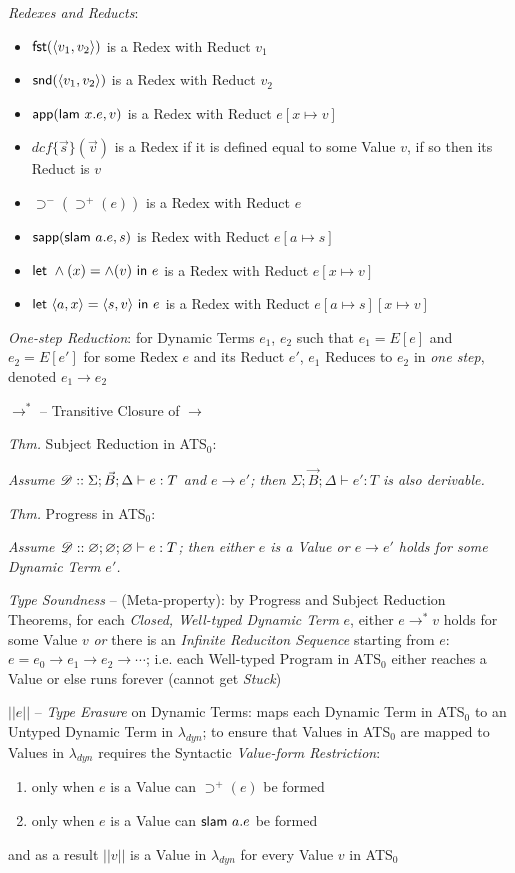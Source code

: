 \emph{Redexes and Reducts}:
\begin{itemize}
\item $\mathsf{fst}(\langle{v_1,v_2}\rangle)$ is a Redex with Reduct $v_1$
\item $\mathsf{snd}(\langle{v_1,v_2}\rangle)$ is a Redex with Reduct $v_2$
\item $\mathsf{app}(\mathsf{lam}\ x.e,v)$ is a Redex with Reduct $e[x \mapsto v]$
\item $dcf\{\vec{s}\}(\vec{v})$ is a Redex if it is defined equal to
  some Value $v$, if so then its Reduct is $v$
\item $\supset^-(\supset^+(e))$ is a Redex with Reduct $e$
\item $\mathsf{sapp}(\mathsf{slam}\ a.e,s)$ is Redex with Reduct $e[a \mapsto s]$
\item $\lett\ \wedge(x) = \wedge(v) \ \inn\ e$ is a Redex with Reduct
  $e[x \mapsto v]$
\item $\mathsf{let}\ \langle{a,x}\rangle = \langle{s,v}\rangle \ \mathsf{in}\ e$ is
  a Redex with Reduct $e[a \mapsto s][x \mapsto v]$
\end{itemize}

\emph{One-step Reduction}: for Dynamic Terms $e_1$, $e_2$ such that
$e_1 = E[e]$ and $e_2 = E[e']$ for some Redex $e$ and its Reduct $e'$,
$e_1$ Reduces to $e_2$ in \emph{one step}, denoted $e_1 \rightarrow
e_2$

$\rightarrow^*$ -- Transitive Closure of $\rightarrow$

\emph{Thm.} Subject Reduction in ATS$_0$:

\emph{Assume $\mathscr{D} :: \Sigma;\vec{B};\Delta \vdash e:T$ and $e
  \rightarrow e'$; then $\Sigma;\vec{B};\Delta \vdash e':T$ is also
  derivable.}


\emph{Thm.} Progress in ATS$_0$:

\emph{Assume $\mathscr{D} :: \varnothing;\varnothing;\varnothing \vdash
  e:T$; then either $e$ is a Value or $e \rightarrow e'$ holds for
  some Dynamic Term $e'$.}

\emph{Type Soundness} -- (Meta-property): by Progress and Subject
Reduction Theorems, for each \emph{Closed, Well-typed Dynamic Term}
$e$, either $e \rightarrow^* v$ holds for some Value $v$ \emph{or}
there is an \emph{Infinite Reduciton Sequence} starting from $e$: $e =
e_0 \rightarrow e_1 \rightarrow e_2 \rightarrow \cdots$; i.e. each
Well-typed Program in ATS$_0$ either reaches a Value or else runs
forever (cannot get \emph{Stuck})

$||e||$ -- \emph{Type Erasure} on Dynamic Terms: maps each Dynamic
Term in ATS$_0$ to an Untyped Dynamic Term in $\lambda_{dyn}$; to
ensure that Values in ATS$_0$ are mapped to Values in $\lambda_{dyn}$
requires the Syntactic \emph{Value-form Restriction}:
\begin{enumerate}
\item only when $e$ is a Value can $\supset^+(e)$ be formed
\item only when $e$ is a Value can $\mathsf{slam}\ a.e$ be formed
\end{enumerate}
and as a result $||v||$ is a Value in $\lambda_{dyn}$ for every Value
$v$ in ATS$_0$

